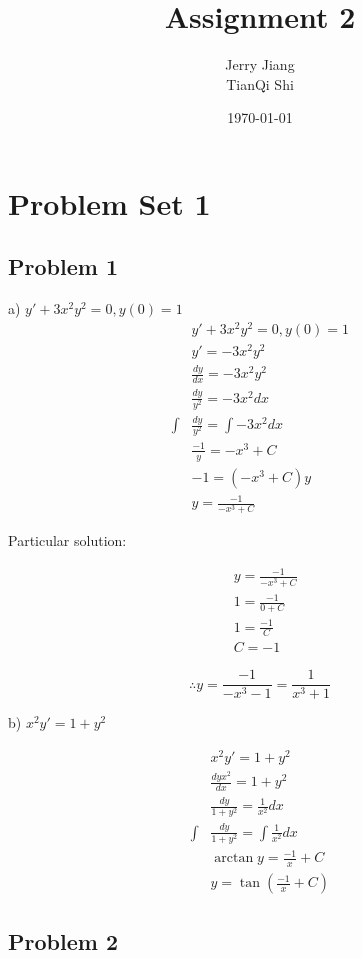 \documentclass[titlepage]{article}
\title{Assignment 2}
\date{\today}
\author{Jerry Jiang\\ TianQi Shi}
\begin{document}
\maketitle

\noindent
\section{Problem Set 1}
\subsection{Problem 1}
a) $y' + 3x^2y^2 = 0, y(0) = 1$
\begin{align*}
  & y' + 3x^2y^2 = 0, y(0) = 1
  \\ & y' = -3x^2y^2
  \\ & \frac{dy}{dx} = -3x^2y^2
  \\ & \frac{dy}{y^2} = -3x^2 dx
  \\ \int & \frac{dy}{y^2} = \int -3x^2 dx
  \\ & \frac{-1}{y} = -x^3 + C
  \\ & -1 = (-x^3 + C)y
  \\ & y = \frac{-1}{-x^3 + C}
\end{align*}

Particular solution:

\begin{align*}
  & y = \frac{-1}{-x^3 + C}
  \\ & 1 = \frac{-1}{0 + C}
  \\ & 1 = \frac{-1}{C}
  \\ & C = -1
\end{align*}

$$\therefore y = \frac{-1}{-x^3 - 1} = \frac{1}{x^3 + 1}$$


\noindent
b) $x^2y' = 1 + y^2$

\begin{align*}
  & x^2y' = 1 + y^2
  \\ & \frac{dyx^2}{dx} = 1 + y^2
  \\ & \frac{dy}{1 + y^2} = \frac{1}{x^2} dx
  \\ \int & \frac{dy}{1 + y^2} = \int \frac{1}{x^2} dx
  \\ & \arctan y = \frac{-1}{x} + C
  \\ & y = \tan(\frac{-1}{x} + C) \end{align*}

\subsection{Problem 2}
\end{document}
